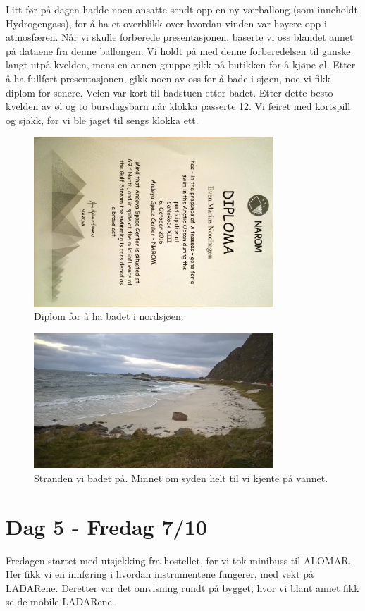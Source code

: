 \documentclass[norsk,a4paper,12pt]{article}
\begin{document}
Litt f{\o}r p{\aa} dagen hadde noen ansatte sendt opp en ny v{\ae}rballong (som inneholdt Hydrogengass), for {\aa} ha et overblikk over hvordan vinden var h{\o}yere opp i atmosf{\ae}ren. N{\aa}r vi skulle forberede presentasjonen, baserte vi oss blandet annet p{\aa} dataene fra denne ballongen. Vi holdt p{\aa} med denne forberedelsen til ganske langt utp{\aa} kvelden, mens en annen gruppe gikk p{\aa} butikken for {\aa} kj{\o}pe {\o}l. Etter {\aa} ha fullf{\o}rt presentasjonen, gikk noen av oss for {\aa} bade i sj{\o}en, noe vi fikk diplom for senere. Veien var kort til badstuen etter badet. Etter dette besto kvelden av {\o}l og to bursdagsbarn n{\aa}r klokka passerte 12. Vi feiret med kortspill og sjakk, f{\o}r vi ble jaget til sengs klokka ett. 

\begin{figure}[H]
\centering
\includegraphics[width=90mm]{Diploma.jpg}
\caption{Diplom for {\aa} ha badet i nordsj{\o}en. \label{overflow}}
\end{figure}
\begin{figure}[H]
\centering
\includegraphics[width=90mm]{strand.jpg}
\caption{Stranden vi badet p{\aa}. Minnet om syden helt til vi kjente p{\aa} vannet. \label{overflow}}
\end{figure}


\section*{Dag 5 - Fredag 7/10}
Fredagen startet med utsjekking fra hostellet, f{\o}r vi tok minibuss til ALOMAR. Her fikk vi en innf{\o}ring i hvordan instrumentene fungerer, med vekt p{\aa} LADARene. Deretter var det omvisning rundt p{\aa} bygget, hvor vi blant annet fikk se de mobile LADARene.
\end{document}
